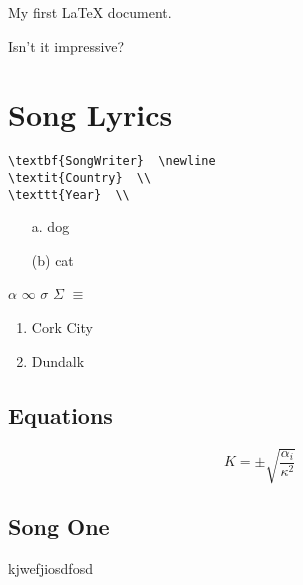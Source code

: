 

My first \LaTeX{} document.



Isn't it impressive?

\newpage
\section{Song Lyrics}

\begin{verbatim}
\textbf{SongWriter}  \newline
\textit{Country}  \\
\texttt{Year}  \\
\end{verbatim}

\begin{itemize}
\item[a.] dog 
\item[(b)] cat
\end{itemize}

$\alpha$
$\infty$
$\sigma$
$\Sigma$
$\equiv$



\begin{enumerate}
\item Cork City
\item Dundalk
\end{enumerate}

\subsection*{Equations}

\begin{equation}
K = \pm \sqrt{  \frac{ \alpha_i }{ \kappa^2 } }
\end{equation}

\subsection*{Song One}
\noindent kjwefjiosdfosd
